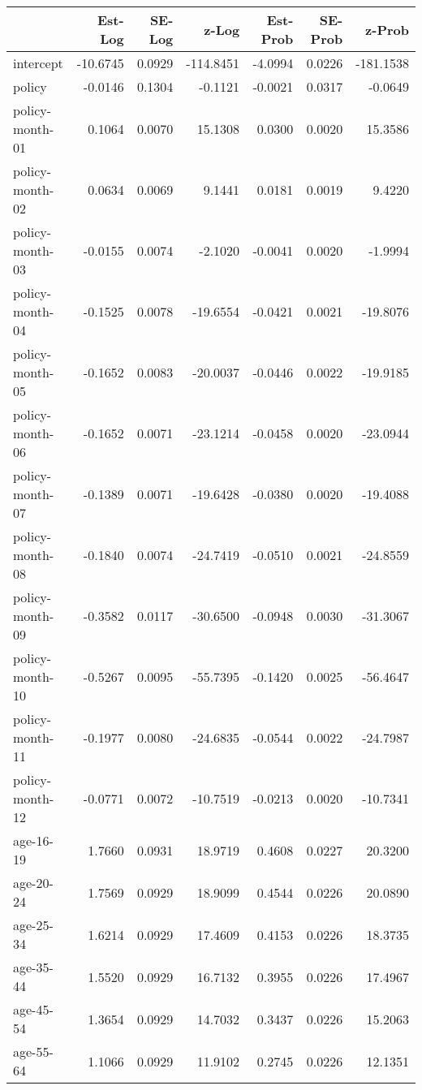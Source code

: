 \documentclass[10pt]{article}
\begin{document}
\begin{table}[ht]
\centering
\begin{tabular}{lrrrrrr}
  \hline
 & Est-Log & SE-Log & z-Log & Est-Prob & SE-Prob & z-Prob \\ 
  \hline
intercept & -10.6745 & 0.0929 & -114.8451 & -4.0994 & 0.0226 & -181.1538 \\ 
  policy & -0.0146 & 0.1304 & -0.1121 & -0.0021 & 0.0317 & -0.0649 \\ 
  policy-month-01 & 0.1064 & 0.0070 & 15.1308 & 0.0300 & 0.0020 & 15.3586 \\ 
  policy-month-02 & 0.0634 & 0.0069 & 9.1441 & 0.0181 & 0.0019 & 9.4220 \\ 
  policy-month-03 & -0.0155 & 0.0074 & -2.1020 & -0.0041 & 0.0020 & -1.9994 \\ 
  policy-month-04 & -0.1525 & 0.0078 & -19.6554 & -0.0421 & 0.0021 & -19.8076 \\ 
  policy-month-05 & -0.1652 & 0.0083 & -20.0037 & -0.0446 & 0.0022 & -19.9185 \\ 
  policy-month-06 & -0.1652 & 0.0071 & -23.1214 & -0.0458 & 0.0020 & -23.0944 \\ 
  policy-month-07 & -0.1389 & 0.0071 & -19.6428 & -0.0380 & 0.0020 & -19.4088 \\ 
  policy-month-08 & -0.1840 & 0.0074 & -24.7419 & -0.0510 & 0.0021 & -24.8559 \\ 
  policy-month-09 & -0.3582 & 0.0117 & -30.6500 & -0.0948 & 0.0030 & -31.3067 \\ 
  policy-month-10 & -0.5267 & 0.0095 & -55.7395 & -0.1420 & 0.0025 & -56.4647 \\ 
  policy-month-11 & -0.1977 & 0.0080 & -24.6835 & -0.0544 & 0.0022 & -24.7987 \\ 
  policy-month-12 & -0.0771 & 0.0072 & -10.7519 & -0.0213 & 0.0020 & -10.7341 \\ 
  age-16-19 & 1.7660 & 0.0931 & 18.9719 & 0.4608 & 0.0227 & 20.3200 \\ 
  age-20-24 & 1.7569 & 0.0929 & 18.9099 & 0.4544 & 0.0226 & 20.0890 \\ 
  age-25-34 & 1.6214 & 0.0929 & 17.4609 & 0.4153 & 0.0226 & 18.3735 \\ 
  age-35-44 & 1.5520 & 0.0929 & 16.7132 & 0.3955 & 0.0226 & 17.4967 \\ 
  age-45-54 & 1.3654 & 0.0929 & 14.7032 & 0.3437 & 0.0226 & 15.2063 \\ 
  age-55-64 & 1.1066 & 0.0929 & 11.9102 & 0.2745 & 0.0226 & 12.1351 \\ 

\end{tabular}
\end{table}
\end{document}
